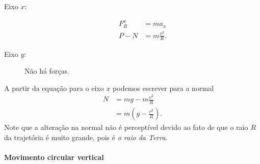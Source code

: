 \begin{description}
    \item[Eixo $x$:] 
        \begin{align}
            F_R^x &= m a_x \\
            P - N &= m \frac{v^2}{R}.
        \end{align}
    \item[Eixo $y$:] Não há forças.
\end{description}

\noindent{}A partir da equação para o eixo $x$ podemos escrever para a normal
\begin{align}
    N &= mg-m\frac{v^2}{R} \\
    &= m \left(g - \frac{v^2}{R}\right).
\end{align}
%
Note que a alteração na normal não é perceptível devido ao fato de que o raio $R$ da trajetória é muito grande, pois é \emph{o raio da Terra}.

\paragraph{Movimento circular vertical}

